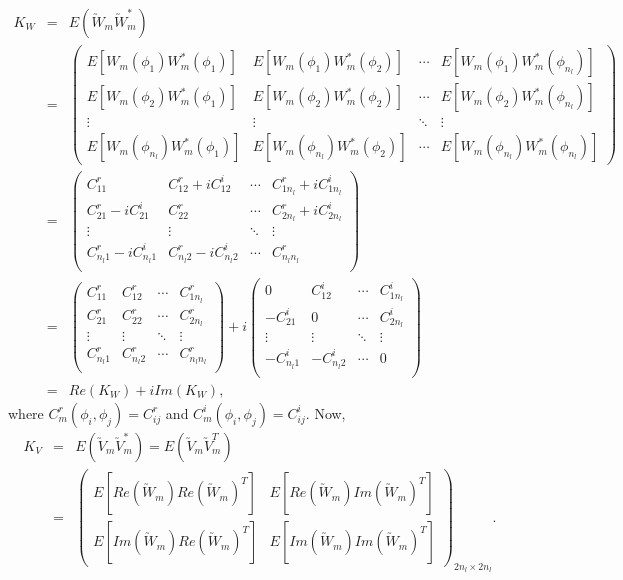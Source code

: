 	\begin{eqnarray*}
		K_W & = & E(\utilde{W}_m\utilde{W}_m^*) \\
		& = &\left(\begin{array}{cccc}
		E[W_m(\phi_1) W_m^*(\phi_1) ] & E[W_m(\phi_1) W_m^*(\phi_2) ]  & \cdots & E[W_m(\phi_1) W_m^*(\phi_{n_l}) ]\\
		E[W_m(\phi_2) W_m^*(\phi_1) ] & E[W_m(\phi_2) W_m^*(\phi_2) ]  & \cdots & E[W_m(\phi_2) W_m^*(\phi_{n_l}) ]\\
		\vdots & \vdots  & \ddots & \vdots \\
		E[W_m(\phi_{n_l}) W_m^*(\phi_1) ] & E[W_m(\phi_{n_l}) W_m^*(\phi_2) ]  & \cdots & E[W_m(\phi_{n_l}) W_m^*(\phi_{n_l})]
		\end{array}
		\right)\\
		& = &\left(\begin{array}{cccc}
		C_{11}^r & C_{12}^r+iC_{12}^i & \cdots & C_{1n_l}^r+iC_{1n_l}^i\\
		C_{21}^r-iC_{21}^i & C_{22}^r & \cdots & C_{2n_l}^r+iC_{2n_l}^i\\
		\vdots & \vdots  & \ddots & \vdots \\
		C_{n_l1}^r-iC_{n_l1}^i & C_{n_l2}^r-iC_{n_l2}^i & \cdots & C_{n_ln_l}^r\\
		\end{array}
		\right) \\
		& = &\left(\begin{array}{cccc}
		C_{11}^r & C_{12}^r & \cdots & C_{1n_l}^r\\
		C_{21}^r & C_{22}^r & \cdots & C_{2n_l}^r\\
		\vdots & \vdots  & \ddots & \vdots \\
		C_{n_l1}^r & C_{n_l2}^r & \cdots & C_{n_ln_l}^r\\
		\end{array}
		\right) + i
		\left(\begin{array}{cccc}
		0 & C_{12}^i & \cdots & C_{1n_l}^i\\
		-C_{21}^i & 0 & \cdots & C_{2n_l}^i\\
		\vdots & \vdots  & \ddots & \vdots \\
		-C_{n_l1}^i & -C_{n_l2}^i & \cdots &  0\\
		\end{array}
		\right)\\
		&=& Re(K_W) + iIm(K_W), 
	\end{eqnarray*}
where $C_m^r(\phi_i, \phi_j) = C_{ij}^r$ and $C_m^i(\phi_i, \phi_j) = C_{ij}^i$. Now,
	\begin{eqnarray*}
		K_V & = & E(\utilde{V}_m\utilde{V}_m^*) = E(\utilde{V}_m\utilde{V}_m^T) \\
		&=& \left(\begin{array}{ll}
		E[Re(\utilde{W}_m)Re(\utilde{W}_m)^T] &  E[Re(\utilde{W}_m)Im(\utilde{W}_m)^T] \\
		E[Im(\utilde{W}_m)Re(\utilde{W}_m)^T] &  E[Im(\utilde{W}_m)Im(\utilde{W}_m)^T]
		\end{array}
		\right)_{2n_{l}\times 2n_{l} }.
	\end{eqnarray*}			
